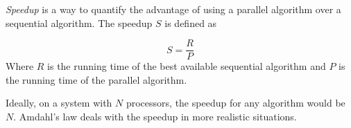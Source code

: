\documentclass[12pt]{article}
\begin{document}
\emph{Speedup} is a way to quantify the advantage of using a parallel algorithm over a sequential algorithm.  The speedup $S$ is defined as

$$ S = \frac{R}{P} $$
Where $R$ is the running time of the best available sequential algorithm and $P$ is the running time of the parallel algorithm.  

Ideally, on a system with $N$ processors, the speedup for any algorithm would be $N$.  Amdahl's law deals with the speedup in more realistic situations.
\end{document}
